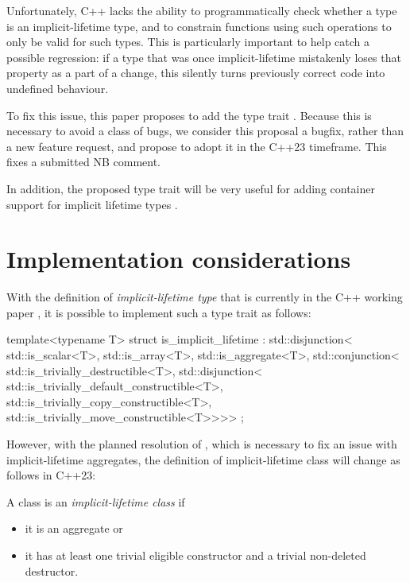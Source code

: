 Unfortunately, C++ lacks the ability to programmatically check whether a type is an implicit-lifetime type, and to constrain functions using such operations to only be valid for such types. This is particularly important to help catch a possible regression: if a type that was once implicit-lifetime mistakenly loses that property as a part of a change, this silently turns previously correct code into undefined behaviour.

To fix this issue, this paper proposes to add the type trait . Because this is necessary to avoid a class of bugs, we consider this proposal a bugfix, rather than a new feature request, and propose to adopt it in the C++23 timeframe. This fixes a submitted NB comment.
\pagebreak %

In addition, the proposed type trait will be very useful for adding container support for implicit lifetime types \cite{P1010R1}.

\section{Implementation considerations}

With the definition of \emph{implicit-lifetime type} that is currently in the C++ working paper \cite{N4917}, it is possible to implement such a type trait as follows:

\begin{codeblock}
template<typename T>
struct is_implicit_lifetime : std::disjunction<
    std::is_scalar<T>,
    std::is_array<T>,
    std::is_aggregate<T>,
    std::conjunction<
        std::is_trivially_destructible<T>,
        std::disjunction<
            std::is_trivially_default_constructible<T>,
            std::is_trivially_copy_constructible<T>,
            std::is_trivially_move_constructible<T>>>> {};
\end{codeblock}

However, with the planned resolution of \cite{CWG2605}, which is necessary to fix an issue with implicit-lifetime aggregates, the definition of implicit-lifetime class will change as follows in C++23:

\begin{adjustwidth}{0.5cm}{0.5cm}
A class  is an \emph{implicit-lifetime class} if 
\begin{itemize}
\item it is an aggregate  or
\item it has at least one trivial eligible constructor and a trivial non-deleted destructor.
\end{itemize}
\end{adjustwidth}


